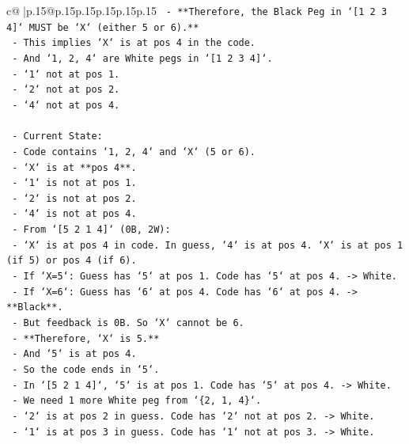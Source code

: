 \documentclass{article}
\begin{document}
{\begin{supertabular}{c@{$\;$}|p{.15\linewidth}@{}p{.15\linewidth}p{.15\linewidth}p{.15\linewidth}p{.15\linewidth}p{.15\linewidth}}
{{{\texttt{        {-} **Therefore, the Black Peg in `{[}1 2 3 4{]}` MUST be `X` (either 5 or 6).**} \\
\texttt{        {-} This implies `X` is at pos 4 in the code.} \\
\texttt{        {-} And `1, 2, 4` are White pegs in `{[}1 2 3 4{]}`.} \\
\texttt{            {-} `1` not at pos 1.} \\
\texttt{            {-} `2` not at pos 2.} \\
\texttt{            {-} `4` not at pos 4.} \\
\\ 
\texttt{    {-} Current State:} \\
\texttt{        {-} Code contains `1, 2, 4` and `X` (5 or 6).} \\
\texttt{        {-} `X` is at **pos 4**.} \\
\texttt{        {-} `1` is not at pos 1.} \\
\texttt{        {-} `2` is not at pos 2.} \\
\texttt{        {-} `4` is not at pos 4.} \\
\texttt{        {-} From `{[}5 2 1 4{]}` (0B, 2W):} \\
\texttt{            {-} `X` is at pos 4 in code. In guess, `4` is at pos 4. `X` is at pos 1 (if 5) or pos 4 (if 6).} \\
\texttt{            {-} If `X=5`: Guess has `5` at pos 1. Code has `5` at pos 4. {-}> White.} \\
\texttt{            {-} If `X=6`: Guess has `6` at pos 4. Code has `6` at pos 4. {-}> **Black**.} \\
\texttt{            {-} But feedback is 0B. So `X` cannot be 6.} \\
\texttt{            {-} **Therefore, `X` is 5.**} \\
\texttt{            {-} And `5` is at pos 4.} \\
\texttt{            {-} So the code ends in `5`.} \\
\texttt{            {-} In `{[}5 2 1 4{]}`, `5` is at pos 1. Code has `5` at pos 4. {-}> White.} \\
\texttt{            {-} We need 1 more White peg from `\{2, 1, 4\}`.} \\
\texttt{            {-} `2` is at pos 2 in guess. Code has `2` not at pos 2. {-}> White.} \\
\texttt{            {-} `1` is at pos 3 in guess. Code has `1` not at pos 3. {-}> White.} \\
}}}
\end{supertabular}}
\end{document}
